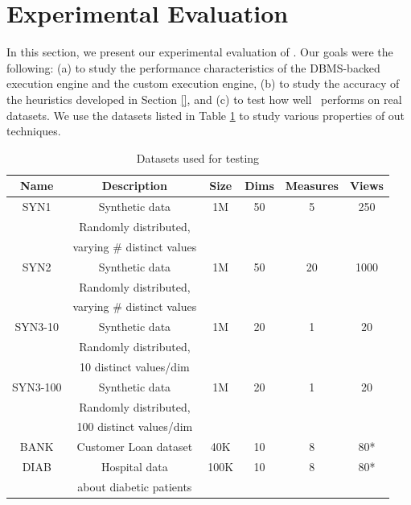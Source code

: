 
\section{Experimental Evaluation}
\label{sec:experiments}
 
In this section, we present our experimental evaluation of
\VizRecDB.
%
%
%
%
Our goals were the following: (a) to study the performance characteristics of
the DBMS-backed execution engine and the custom execution engine, (b) to study the
accuracy of the heuristics developed in Section \ref{}, and (c) to test how well
\VizRecDB\ performs on real datasets. 
We use the datasets listed in Table
\ref{tab:datasets} to study various properties of out techniques.

\begin{table}[htb]
  \centering \scriptsize
  \begin{tabular}{|c|c|c|c|c|c|} \hline
  Name & Description & Size & Dims & Measures & Views \\ \hline
  SYN1 & Synthetic data & 1M & 50 & 5 & 250 \\
  & Randomly distributed, & & & & \\ 
  & varying \# distinct values & & & & \\ \hline
  SYN2 & Synthetic data & 1M & 50 & 20 & 1000 \\
  & Randomly distributed, & & & & \\ 
  & varying \# distinct values & & & & \\ \hline
  SYN3-10 & Synthetic data & 1M & 20 & 1 & 20 \\
  & Randomly distributed, & & & & \\ 
  & 10 distinct values/dim & & & & \\ \hline
  SYN3-100 & Synthetic data & 1M & 20 & 1 & 20 \\
  & Randomly distributed, & & & & \\ 
  & 100 distinct values/dim & & & & \\ \hline
  BANK  & Customer Loan dataset  & 40K & 10 & 8 & 80* \\ \hline
  DIAB  & Hospital data & 100K & 10 & 8 & 80* \\
  & about diabetic patients & & & & \\ \hline
  \end{tabular}
  \caption{Datasets used for testing}
  \label{tab:datasets} 
\end{table}

